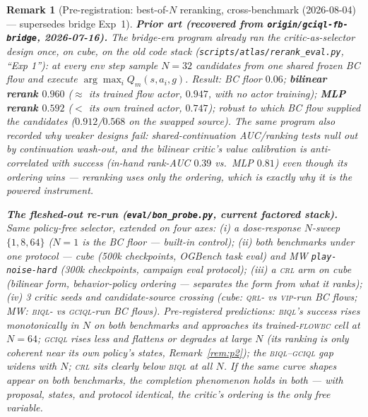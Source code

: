\documentclass[10pt]{article}
\newtheorem{remark}{Remark}
\begin{document}
\begin{remark}[Pre-registration: best-of-$N$ reranking, cross-benchmark (2026-08-04) ---
supersedes bridge Exp~1]\label{rem:bon}
\textbf{Prior art (recovered from \texttt{origin/gciql-fb-bridge}, 2026-07-16).} The
bridge-era program already ran the critic-as-selector design once, on cube, on the old code
stack (\texttt{scripts/atlas/rerank\_eval.py}, ``Exp 1''): at every env step sample $N{=}32$
candidates from one shared frozen BC flow and execute $\arg\max_i Q_m(s,a_i,g)$. Result:
BC floor $0.06$; \textbf{bilinear rerank $0.960$} ($\approx$ its trained flow actor,
$0.947$, with no actor training); \textbf{MLP rerank $0.592$} ($<$ its own trained actor,
$0.747$); robust to which BC flow supplied the candidates ($0.912$/$0.568$ on the swapped
source). The same program also recorded why weaker designs fail: shared-continuation
AUC/ranking tests null out by continuation wash-out, and the bilinear critic's value
\emph{calibration} is anti-correlated with success (in-hand rank-AUC $0.39$ vs.\ MLP
$0.81$) even though its \emph{ordering} wins --- reranking uses only the ordering, which is
exactly why it is the powered instrument.

\textbf{The fleshed-out re-run (\texttt{eval/bon\_probe.py}, current factored stack).}
Same policy-free selector, extended on four axes: (i) a dose-response $N$-sweep
$\{1,8,64\}$ ($N{=}1$ \emph{is} the BC floor --- built-in control); (ii) both benchmarks
under one protocol --- cube (500k checkpoints, OGBench task eval) and MW
\texttt{play-noise-hard} (300k checkpoints, campaign eval protocol); (iii) a \textsc{crl}
arm on cube (bilinear form, behavior-policy ordering --- separates the form from what it
ranks); (iv) 3 critic seeds and candidate-source crossing (cube: \textsc{qrl}- vs
\textsc{vip}-run BC flows; MW: \textsc{biql}- vs \textsc{gciql}-run BC flows).
Pre-registered predictions: \textsc{biql}'s success rises monotonically in $N$ on
\emph{both} benchmarks and approaches its trained-\textsc{flowbc} cell at $N{=}64$;
\textsc{gciql} rises less and flattens or degrades at large $N$ (its ranking is only
coherent near its own policy's states, Remark~\ref{rem:p2}); the \textsc{biql}--\textsc{gciql}
gap widens with $N$; \textsc{crl} sits clearly below \textsc{biql} at all $N$. If the same
curve shapes appear on both benchmarks, the completion phenomenon holds in both --- with
proposal, states, and protocol identical, the critic's ordering is the only free variable.


\end{remark}
\end{document}
